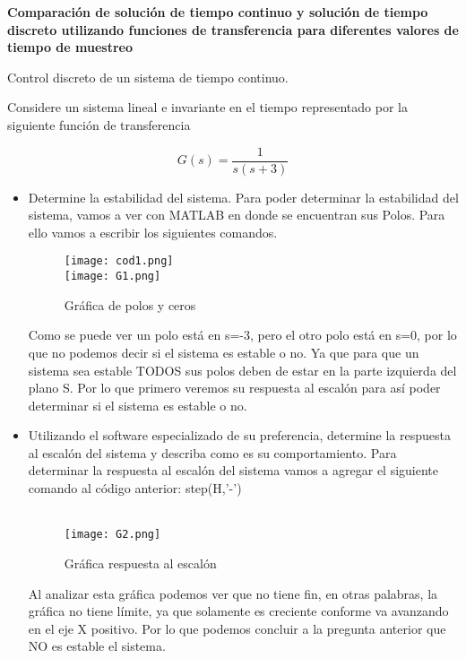 \textbf{Comparación de solución de tiempo continuo y solución de tiempo discreto utilizando funciones de transferencia para diferentes valores de tiempo de muestreo }

{\Large Control discreto de un sistema de tiempo continuo.}

Considere un sistema lineal e invariante en el tiempo representado por la siguiente función de transferencia

\begin{equation*}
	G(s)=\frac{1}{s(s+3)}
\end{equation*}

\begin{itemize}
	\item Determine la estabilidad del sistema.
Para poder determinar la estabilidad del sistema, vamos a ver con MATLAB en donde se encuentran sus Polos. Para ello vamos a escribir los siguientes comandos.\\


\begin{figure}[H]
	\centering
	\texttt{[image: cod1.png]} \\
	\texttt{[image: G1.png]}
	\caption{{Gráfica de polos y ceros}}
	\label{fig:salidaTs001-4}
\end{figure}

Como se puede ver un polo está en s=-3, pero el otro polo está en s=0, por lo que no podemos decir si el sistema es estable o no. Ya que para que un sistema sea estable TODOS sus polos deben de estar en la parte izquierda del plano S. Por lo que primero veremos su respuesta al escalón para así poder determinar si el sistema es estable o no.

	\item Utilizando el software especializado de su preferencia, determine la respuesta al escalón del sistema y describa como es su comportamiento.
Para determinar la respuesta al escalón del sistema vamos a agregar el siguiente comando al código anterior: step(H,'-')\\
 \\

\begin{figure}[H]
	\centering
	\texttt{[image: G2.png]}
	\caption{{Gráfica respuesta al escalón}}
	\label{fig:salidaTs001-5}
\end{figure}

Al analizar esta gráfica podemos ver que no tiene fin, en otras palabras, la gráfica no tiene límite, ya que solamente es creciente conforme va avanzando en el eje X positivo. Por lo que podemos concluir a la pregunta anterior que NO es estable el sistema.

\end{itemize}
